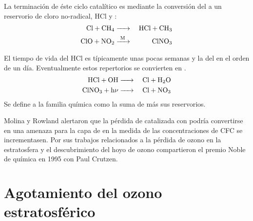 La terminación de éste ciclo catalítico es mediante la conversión del  a un reservorio de cloro no-radical, HCl y :
\begin{eqnarray*}
 \ce{Cl + CH4   & ->   & HCl + CH3 \\
       ClO + NO2        &  ->[M]  & ClNO3}
\end{eqnarray*}

El tiempo de vida del HCl es típicamente unas pocas semanas y la del  en el orden de un día. Eventualmente estos repertorios se convierten en .
\begin{eqnarray*}
 \ce{HCl + OH   & ->   & Cl + H2O \\
       ClNO3 +   h$\nu$   &  ->  & Cl + NO3}
\end{eqnarray*}
Se define a la familia química  como la suma de  más sus reservorios.   

Molina y Rowland alertaron que la pérdida de   catalizada con   podría convertirse en una amenaza para la capa de   en la medida de las concentraciones de CFC se incrementasen. Por sus trabajos relacionados a la pérdida de ozono en la estratosfera y el descubrimiento del hoyo de ozono compartieron el premio Noble de química en 1995 con Paul Crutzen.

\section{Agotamiento del ozono estratosférico}


